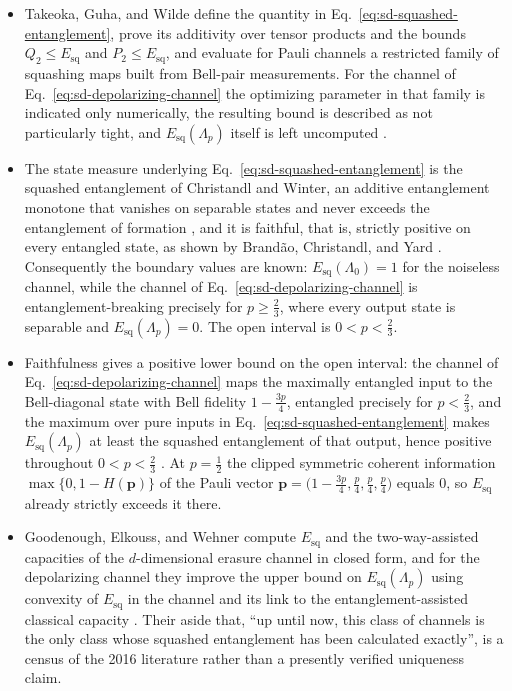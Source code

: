 \begin{itemize}
  \item Takeoka, Guha, and Wilde define the quantity in
  Eq.~\eqref{eq:sd-squashed-entanglement}, prove its additivity over tensor
  products and the bounds $Q_2\le E_{\mathrm{sq}}$ and
  $P_2\le E_{\mathrm{sq}}$, and evaluate for Pauli channels a restricted
  family of squashing maps built from Bell-pair measurements.  For the
  channel of Eq.~\eqref{eq:sd-depolarizing-channel} the optimizing parameter
  in that family is indicated only numerically, the resulting bound is
  described as not particularly tight, and $E_{\mathrm{sq}}(\Lambda_p)$
  itself is left uncomputed .

  \item The state measure underlying Eq.~\eqref{eq:sd-squashed-entanglement} is the
  squashed entanglement of Christandl and Winter, an additive entanglement
  monotone that vanishes on separable states and never exceeds the
  entanglement of formation , and
  it is faithful, that is, strictly positive on every entangled state, as
  shown by Brand\~ao, Christandl, and Yard
  .
  Consequently the boundary values are known:
  $E_{\mathrm{sq}}(\Lambda_0)=1$ for the noiseless channel, while the channel
  of Eq.~\eqref{eq:sd-depolarizing-channel} is entanglement-breaking
  precisely for $p\ge\tfrac{2}{3}$, where every output state is separable and
  $E_{\mathrm{sq}}(\Lambda_p)=0$.  The open interval is $0<p<\tfrac{2}{3}$.

  \item Faithfulness gives a positive lower bound on the open interval: the channel
  of Eq.~\eqref{eq:sd-depolarizing-channel} maps the maximally entangled
  input to the Bell-diagonal state with Bell fidelity $1-\tfrac{3p}{4}$,
  entangled precisely for $p<\tfrac{2}{3}$, and the maximum over pure inputs
  in Eq.~\eqref{eq:sd-squashed-entanglement} makes $E_{\mathrm{sq}}(\Lambda_p)$
  at least the squashed entanglement of that output, hence positive
  throughout $0<p<\tfrac{2}{3}$
  .  At $p=\tfrac{1}{2}$ the
  clipped symmetric coherent information $\max\{0,1-H(\mathbf p)\}$ of the
  Pauli vector
  $\mathbf p=\bigl(1-\tfrac{3p}{4},\tfrac{p}{4},\tfrac{p}{4},\tfrac{p}{4}\bigr)$
  equals $0$, so $E_{\mathrm{sq}}$ already strictly exceeds it there.

  \item Goodenough, Elkouss, and Wehner compute $E_{\mathrm{sq}}$ and the
  two-way-assisted capacities of the $d$-dimensional erasure channel in
  closed form, and for the depolarizing channel they improve the upper bound
  on $E_{\mathrm{sq}}(\Lambda_p)$ using convexity of $E_{\mathrm{sq}}$ in the
  channel and its link to the entanglement-assisted classical capacity
  .  Their aside that, ``up until now, this class of
  channels is the only class whose squashed entanglement has been calculated
  exactly'',
  is a census of the 2016 literature rather than a presently verified
  uniqueness claim.


\end{itemize}

